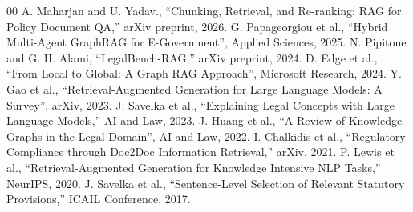 \documentclass[conference]{IEEEtran}
\begin{document}
\begin{thebibliography}{00}
 A. Maharjan and U. Yadav., ``Chunking, Retrieval, and Re-ranking: RAG for Policy Document QA,'' arXiv preprint, 2026.
 G. Papageorgiou et al., ``Hybrid Multi-Agent GraphRAG for E-Government'', Applied Sciences, 2025.
 N. Pipitone and G. H. Alami, ``LegalBench-RAG,'' arXiv preprint, 2024.
 D. Edge et al., ``From Local to Global: A Graph RAG Approach'', Microsoft Research, 2024.
 Y. Gao et al., ``Retrieval-Augmented Generation for Large Language Models: A Survey'', arXiv, 2023.
 J. Savelka et al., ``Explaining Legal Concepts with Large Language Models,'' AI and Law, 2023.
 J. Huang et al., ``A Review of Knowledge Graphs in the Legal Domain'', AI and Law, 2022.
 I. Chalkidis et al., ``Regulatory Compliance through Doc2Doc Information Retrieval,'' arXiv, 2021.
 P. Lewis et al., ``Retrieval-Augmented Generation for Knowledge Intensive NLP Tasks,'' NeurIPS, 2020.
 J. Savelka et al., ``Sentence-Level Selection of Relevant Statutory Provisions,'' ICAIL Conference, 2017.
\end{thebibliography}
\end{document}
